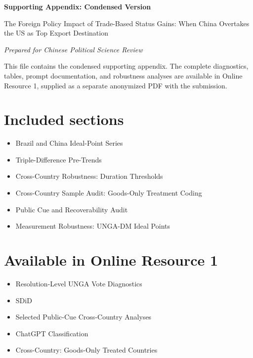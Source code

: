 \documentclass[11pt]{article}
\begin{document}
\thispagestyle{empty}

\begin{center}

{\Large\bfseries Supporting Appendix: Condensed Version\par}

\vspace{0.5cm}

{\large The Foreign Policy Impact of Trade-Based Status Gains: When China Overtakes the US as Top Export Destination\par}

\vspace{0.3cm}

\emph{Prepared for Chinese Political Science Review}

\end{center}

\vspace{0.8cm}

This file contains the condensed supporting appendix. The complete diagnostics, tables, prompt documentation, and robustness analyses are available in Online Resource 1, supplied as a separate anonymized PDF with the submission.

\section*{Included sections}

\begin{itemize}

\item Brazil and China Ideal-Point Series

\item Triple-Difference Pre-Trends

\item Cross-Country Robustness: Duration Thresholds

\item Cross-Country Sample Audit: Goods-Only Treatment Coding

\item Public Cue and Recoverability Audit

\item Measurement Robustness: UNGA-DM Ideal Points

\end{itemize}

\section*{Available in Online Resource 1}

\begin{itemize}

\item Resolution-Level UNGA Vote Diagnostics

\item SDiD

\item Selected Public-Cue Cross-Country Analyses

\item ChatGPT Classification

\item Cross-Country: Goods-Only Treated Countries

\end{itemize}
\end{document}

